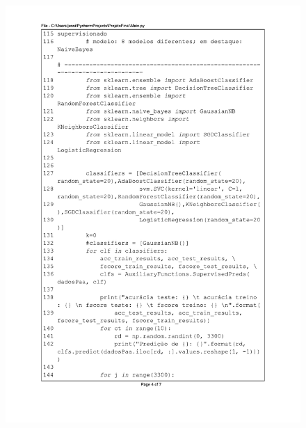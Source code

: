 \begin{figure}[H]
\centering
\includegraphics[scale=0.9]{01_Pre_textuais/code/main4.pdf}
\end{figure}
